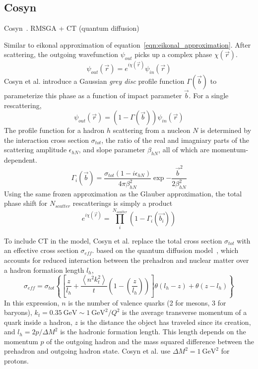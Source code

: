 \subsection{Cosyn}
Cosyn~\cite{Cosyn_2006}. RMSGA + CT (quantum diffusion)

Similar to eikonal approximation of equation~\ref{eqn:eikonal_approximation}.
After scattering, the outgoing wavefunction $\psi_{out}$ picks up a complex
phase $\chi(\vec{r})$.
\begin{equation}
    \psi_{out}(\vec{r}) = e^{i\chi(\vec{r})} \psi_{in}(\vec{r})
\end{equation}
Cosyn et al. introduce a Gaussian \textit{grey disc} profile function
$\Gamma(\vec{b})$ to parameterize this phase as a function of impact parameter
$\vec{b}$.
For a single rescattering,
\begin{equation}
    \psi_{out}(\vec{r}) = (1-\Gamma(\vec{b})) \psi_{in}(\vec{r})
\end{equation}
The profile function for a hadron $h$ scattering from a nucleon $N$ is
determined by
the interaction cross section $\sigma_{tot}$,
the ratio of the real and imagniary parts of the scattering amplitude $\epsilon_{hN}$,
and
slope parameter $\beta_{hN}$,
all of which are momentum-dependent.
\begin{equation}
    \Gamma_i(\vec{b}) =
        \frac{\sigma_{tot}(1-i\epsilon_{hN})}
             {4\pi\beta_{hN}^2}
        \exp{-\frac{\vec{b}^2}{2\beta_{hN}^2}}
\end{equation}
Using the same frozen approximation as the Glauber approximation, the total
phase shift for $N_{scatter}$ rescatterings is simply a product
\begin{equation}
    e^{i\chi(\vec{r})} = \prod_i^{N_{scatter}} \left(1-\Gamma_i(\vec{b_i})\right)
\end{equation}


To include CT in the model, Cosyn et al. replace
the total cross section $\sigma_{tot}$
with
an effective cross section $\sigma_{eff}$.
based on the quantum diffusion model~\cite{Farrar_1988},
which accounts for reduced interaction between the prehadron and nuclear matter
over a hadron formation length $l_h$,
\begin{equation}
    \sigma_{eff} = \sigma_{tot}
    \left\{
        \left[\frac{z}{l_h} +
               \frac{\left\langle n^{2} k_{t}^{2}\right\rangle}{t} \left(1-\left(\frac{z}{l_h}\right)\right)
        \right]
        \theta\left(l_h-z\right) +
        \theta\left(z-l_h\right)
    \right\}
\end{equation}
In this expression,
$n$ is the number of valence quarks (2 for mesons, 3 for baryons),
$k_t=\SI{0.35}{\giga\electronvolt}\sim \SI{1}{\giga\electronvolt\squared}/Q^2$
is the average transverse momentum of a quark inside a hadron,
$z$ is the distance the object has traveled since its creation,
and
$l_h=2p/\Delta M^2$ is the hadronic formation length.
This length depends on
the momentum $p$ of the outgoing hadron
and
the mass squared difference between the prehadron and outgoing hadron state.
Cosyn et al. use $\Delta M^2 = \SI{1}{\giga\electronvolt\squared}$ for protons.

